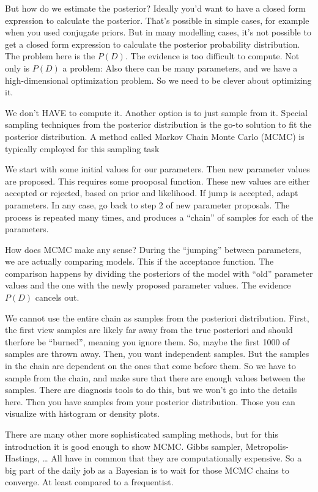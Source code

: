 \documentclass[
  10pt,
]{scrbook}
\begin{document}
But how do we estimate the posterior?
Ideally you'd want to have a closed form expression to calculate the posterior.
That's possible in simple cases, for example when you used conjugate priors.
But in many modelling cases, it's not possible to get a closed form expression to calculate the posterior probability distribution.
The problem here is the \(P(D)\).
The evidence is too difficult to compute.
Not only is \(P(D)\) a problem:
Also there can be many parameters, and we have a high-dimensional optimization problem.
So we need to be clever about optimizing it.

We don't HAVE to compute it.
Another option is to just sample from it.
Special sampling techniques from the posterior distribution is the go-to solution to fit the posterior distribution.
A method called Markov Chain Monte Carlo (MCMC) is typically employed for this sampling task

We start with some initial values for our parameters.
Then new parameter values are proposed.
This requires some prooposal function.
These new values are either accepted or rejected, based on prior and likelihood.
If jump is accepted, adapt parameters.
In any case, go back to step 2 of new parameter proposals.
The process is repeated many times, and produces a ``chain'' of samples for each of the parameters.

How does MCMC make any sense?
During the ``jumping'' between parameters, we are actually comparing models.
This if the acceptance function.
The comparison happens by dividing the posteriors of the model with ``old'' parameter values and the one with the newly proposed parameter values.
The evidence \(P(D)\) cancels out.

We cannot use the entire chain as samples from the posteriori distribution.
First, the first view samples are likely far away from the true posteriori and should therfore be ``burned'', meaning you ignore them.
So, maybe the first 1000 of samples are thrown away.
Then, you want independent samples.
But the samples in the chain are dependent on the ones that come before them.
So we have to sample from the chain, and make sure that there are enough values between the samples.
There are diagnosis tools to do this, but we won't go into the details here.
Then you have samples from your posterior distribution.
Those you can visualize with histogram or density plots.

There are many other more sophisticated sampling methods, but for this introduction it is good enough to show MCMC.
Gibbs sampler, Metropolis-Hastings, \ldots{}
All have in common that they are computationally expensive.
So a big part of the daily job as a Bayesian is to wait for those MCMC chains to converge.
At least compared to a frequentist.
\end{document}
